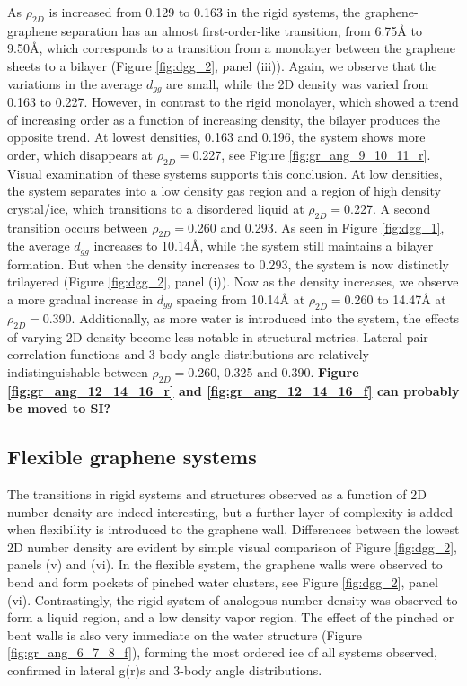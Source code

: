 \documentclass[12pt]{article}
\begin{document}
As \(\rho_{2D}\) is increased from 0.129 to 0.163 in the rigid systems, the graphene-graphene separation has an almost first-order-like transition, from 6.75\r A to 9.50\r A, which corresponds to a transition from a monolayer between the graphene sheets to a bilayer (Figure \ref{fig:dgg_2}, panel (iii)). Again, we observe that the variations in the average \(d_{gg}\) are small, while the 2D density was varied from 0.163 to 0.227. However, in contrast to the rigid monolayer, which showed a trend of increasing order as a function of increasing density, the bilayer produces the opposite trend. At lowest densities, 0.163 and 0.196, the system shows more order, which disappears at \(\rho_{2D}=\)0.227, see Figure \ref{fig:gr_ang_9_10_11_r}. Visual examination of these systems supports this conclusion. At low densities, the system separates into a low density gas region and a region of high density crystal/ice, which transitions to a disordered liquid at \(\rho_{2D}=\)0.227. A second transition occurs between \(\rho_{2D}=\)0.260 and 0.293. As seen in Figure \ref{fig:dgg_1}, the average \(d_{gg}\) increases to 10.14\r A, while the system still maintains a bilayer formation. But when the density increases to 0.293, the system is now distinctly trilayered (Figure \ref{fig:dgg_2}, panel (i)). Now as the density increases, we observe a more gradual increase in \(d_{gg}\) spacing from 10.14\r A at \(\rho_{2D}=\)0.260 to 14.47\r A at \(\rho_{2D}=\)0.390. Additionally, as more water is introduced into the system, the effects of varying 2D density become less notable in structural metrics. Lateral pair-correlation functions and 3-body angle distributions are relatively indistinguishable between \(\rho_{2D}=\)0.260, 0.325 and 0.390. \textbf{\color{red} Figure \ref{fig:gr_ang_12_14_16_r} and \ref{fig:gr_ang_12_14_16_f} can probably be moved to SI?}

\subsection*{Flexible graphene systems}

The transitions in rigid systems and structures observed as a function of 2D number density are indeed interesting, but a further layer of complexity is added when flexibility is introduced to the graphene wall. Differences between the lowest 2D number density are evident by simple visual comparison of Figure \ref{fig:dgg_2}, panels (v) and (vi). In the flexible system, the graphene walls were observed to bend and form pockets of pinched water clusters, see Figure \ref{fig:dgg_2}, panel (vi). Contrastingly, the rigid system of analogous number density was observed to form a liquid region, and a low density vapor region. The effect of the pinched or bent walls is also very immediate on the water structure (Figure \ref{fig:gr_ang_6_7_8_f}), forming the most ordered ice of all systems observed, confirmed in lateral g(r)s and 3-body angle distributions.
\end{document}
